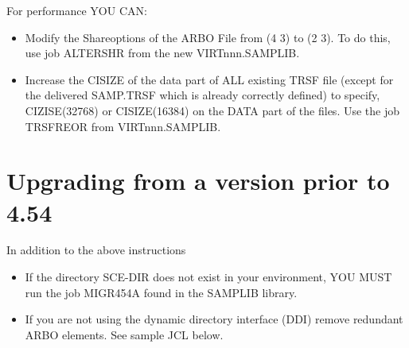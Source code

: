 \documentclass[letterpaper,10pt,english]{sphinxmanual}
\begin{document}
For performance YOU CAN:
\begin{itemize}
\item {} 
Modify the Shareoptions of the ARBO File from (4 3) to (2 3). To do this, use job ALTERSHR from the new VIRTnnn.SAMPLIB.

\item {} 
Increase the CISIZE of the data part of ALL existing TRSF file (except for the delivered SAMP.TRSF which is already correctly defined) to specify, CIZISE(32768) or CISIZE(16384) on the DATA part of the files. Use the job TRSFREOR from VIRTnnn.SAMPLIB.

\end{itemize}

\ignorespaces 

\section{Upgrading from a version prior to 4.54}
\label{\detokenize{Migration_Guide:upgrading-from-a-version-prior-to-4-54}}\label{\detokenize{Migration_Guide:index-4}}
In addition to the above instructions
\begin{itemize}
\item {} 
If the directory SCE-DIR does not exist in your environment, YOU MUST run the job MIGR454A found in the SAMPLIB library.

\item {} 
If you are not using the dynamic directory interface (DDI) remove redundant ARBO elements. See sample JCL below.

\end{itemize}
\end{document}
